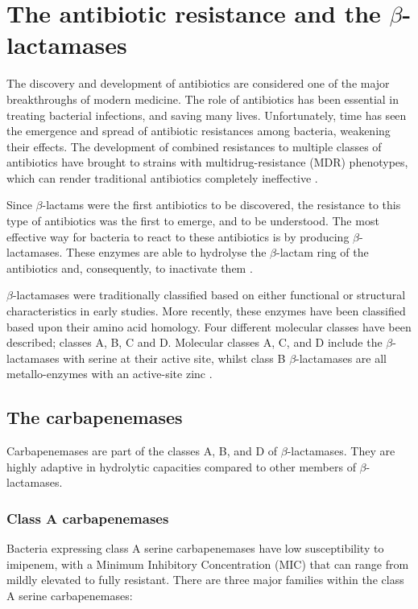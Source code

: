\documentclass[11pt]{report}
\begin{document}
\chapter{The antibiotic resistance and the $\beta$-lactamases}

The discovery and development of antibiotics are considered one of the major breakthroughs of modern medicine.
The role of antibiotics has been essential in treating bacterial infections, and saving many lives.
Unfortunately, time has seen the emergence and spread of antibiotic resistances among bacteria, weakening their effects.
The development of combined resistances to multiple classes of antibiotics have brought to strains with multidrug-resistance (MDR) phenotypes, which can render traditional antibiotics completely ineffective \cite{Rossolini2014}.

Since $\beta$-lactams were the first antibiotics to be discovered, the resistance to this type of antibiotics was the first to emerge, and to be understood.
The most effective way for bacteria to react to these antibiotics is by producing $\beta$-lactamases.
These enzymes are able to hydrolyse the $\beta$-lactam ring of the antibiotics and, consequently, to inactivate them \cite{kong2010beta}.

$\beta$-lactamases were traditionally classified based on either functional or structural characteristics in early studies.
More recently, these enzymes have been classified based upon their amino acid homology. Four different molecular classes have been described; classes A, B, C and D. Molecular classes A, C, and D include the $\beta$-lactamases with serine at their active site, whilst class B $\beta$-lactamases are all metallo-enzymes with an active-site zinc \cite{Queenan2007}.

\section{The carbapenemases}
Carbapenemases are part of the classes A, B, and D of $\beta$-lactamases. They are highly adaptive in hydrolytic capacities compared to other members of $\beta$-lactamases.

\subsection{Class A carbapenemases}
Bacteria expressing class A serine carbapenemases have low susceptibility to imipenem, with a Minimum Inhibitory Concentration (MIC) that can range from mildly elevated to fully resistant. 
There are three major families within the class A serine carbapenemases:
\end{document}

